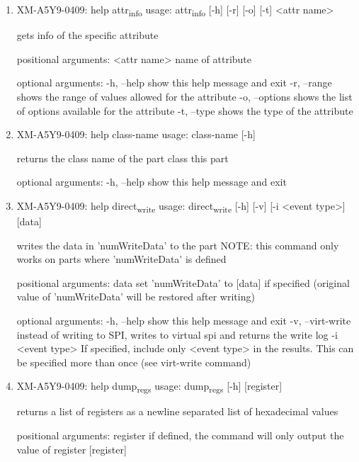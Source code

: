 \documentclass[11pt]{article}
\begin{document}
\begin{enumerate}
\item XM-A5Y9-0409: help attr\textsubscript{info}
\label{sec:org04e950d}
usage: attr\textsubscript{info} [-h] [-r] [-o] [-t] <attr name>

gets info of the specific attribute

positional arguments:
  <attr name>    name of attribute

optional arguments:
  -h, --help     show this help message and exit
  -r, --range    shows the range of values allowed for the attribute
  -o, --options  shows the list of options available for the attribute
  -t, --type     shows the type of the attribute

\item XM-A5Y9-0409: help class-name
\label{sec:orgf8976eb}
usage: class-name [-h]

returns the class name of the part class this part

optional arguments:
  -h, --help  show this help message and exit

\item XM-A5Y9-0409: help direct\textsubscript{write}
\label{sec:org27e6be8}
usage: direct\textsubscript{write} [-h] [-v] [-i <event type>] [data]

writes the data in 'numWriteData' to the part NOTE: this command only works on
parts where 'numWriteData' is defined

positional arguments:
  data              set 'numWriteData' to [data] if specified (original value
                    of 'numWriteData' will be restored after writing)

optional arguments:
  -h, --help        show this help message and exit
  -v, --virt-write  instead of writing to SPI, writes to virtual spi and
                    returns the write log
  -i <event type>   If specified, include only <event type> in the results.
                    This can be specified more than once (see virt-write
                    command)

\item XM-A5Y9-0409: help dump\textsubscript{regs}
\label{sec:org0713543}
usage: dump\textsubscript{regs} [-h] [register]

returns a list of registers as a newline separated list of hexadecimal values

positional arguments:
  register    if defined, the command will only output the value of register
              [register]


\end{enumerate}
\end{document}
